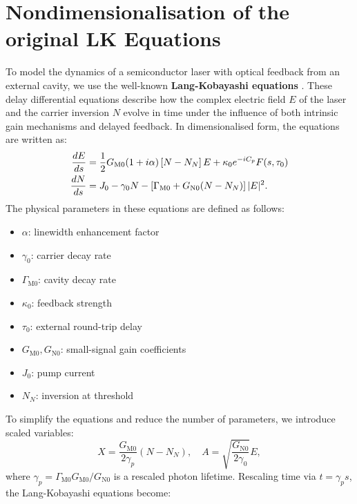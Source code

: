 \section{Nondimensionalisation of the original LK Equations}
\label{sec:LK_nondim}
%
\let\cleardoublepage\origcleardoublepage
%
To model the dynamics of a semiconductor laser with optical feedback from an external cavity, we use the well-known \textbf{Lang-Kobayashi equations} \cite{lang1980external}. These delay differential equations describe how the complex electric field \( E \) of the laser and the carrier inversion \( N \) evolve in time under the influence of both intrinsic gain mechanisms and delayed feedback. In dimensionalised form, the equations are written as:
%
\begin{gather}
\label{eq:dimensionalised_LK}
\begin{aligned}
\frac{d E}{d s} &= \frac{1}{2} G_{\mathrm{M}0}(1 + i \alpha) \left[N - N_N\right] E + \kappa_0 e^{-i C_p} F(s, \tau_0)\\
\frac{d N}{d s} &= J_0 - \gamma_0 N - \left[\Gamma_{\mathrm{M}0} + G_{\mathrm{N}0}(N - N_N)\right] |E|^2.\\
\end{aligned}
\raisetag{-1.5em} %
\end{gather}
%
The physical parameters in these equations are defined as follows:
\begin{itemize}
  \item \( \alpha \): linewidth enhancement factor
  \item \( \gamma_0 \): carrier decay rate
  \item \( \Gamma_{\mathrm{M}0} \): cavity decay rate
  \item \( \kappa_0 \): feedback strength
  \item \( \tau_0 \): external round-trip delay
  \item \( G_{\mathrm{M}0}, G_{\mathrm{N}0} \): small-signal gain coefficients
  \item \( J_0 \): pump current
  \item \( N_N \): inversion at threshold
\end{itemize}
%
\par
%
To simplify the equations and reduce the number of parameters, we introduce scaled variables:
%
\[
X = \frac{G_{\mathrm{M}0}}{2 \gamma_p}(N - N_N), \quad A = \sqrt{\frac{G_{\mathrm{N}0}}{2 \gamma_0}} E,
\]
where \( \gamma_p = \Gamma_{\mathrm{M}0} G_{\mathrm{M}0} / G_{\mathrm{N}0} \) is a rescaled photon lifetime. Rescaling time via \( t = \gamma_p s \), the Lang-Kobayashi equations become:
